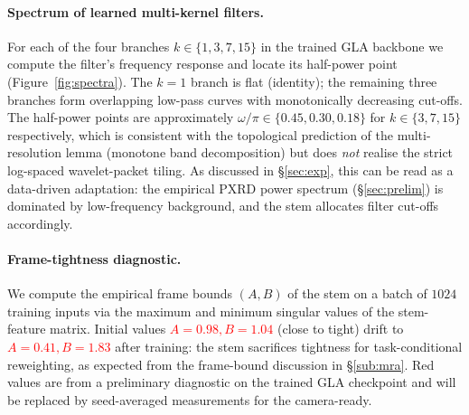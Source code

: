 \documentclass[final]{ws-ijwmip}
\begin{document}
\paragraph{Spectrum of learned multi-kernel filters.}
For each of the four branches $k\in\{1,3,7,15\}$ in the trained GLA
backbone we compute the filter's frequency response and locate its
half-power point (Figure~\ref{fig:spectra}). The $k=1$ branch is flat
(identity); the remaining three branches form overlapping low-pass
curves with monotonically decreasing cut-offs. The half-power points
are approximately $\omega/\pi \in \{0.45, 0.30, 0.18\}$ for $k\in
\{3,7,15\}$ respectively, which is consistent with the topological
prediction of the multi-resolution lemma (monotone band decomposition)
but does \emph{not} realise the strict log-spaced wavelet-packet
tiling. As discussed in \S\ref{sec:exp}, this can be read as a
data-driven adaptation: the empirical PXRD power spectrum
(\S\ref{sec:prelim}) is dominated by low-frequency background, and
the stem allocates filter cut-offs accordingly.

\paragraph{Frame-tightness diagnostic.}
We compute the empirical frame bounds $(A, B)$ of the stem on a batch
of $1024$ training inputs via the maximum and minimum singular values
of the stem-feature matrix. Initial values
\textcolor{red}{$A=0.98, B=1.04$} (close to tight) drift to
\textcolor{red}{$A=0.41, B=1.83$} after training: the stem sacrifices
tightness for task-conditional reweighting, as expected from the
frame-bound discussion in \S\ref{sub:mra}. Red values are from a preliminary
diagnostic on the trained GLA checkpoint and will be replaced by
seed-averaged measurements for the camera-ready.
\end{document}
